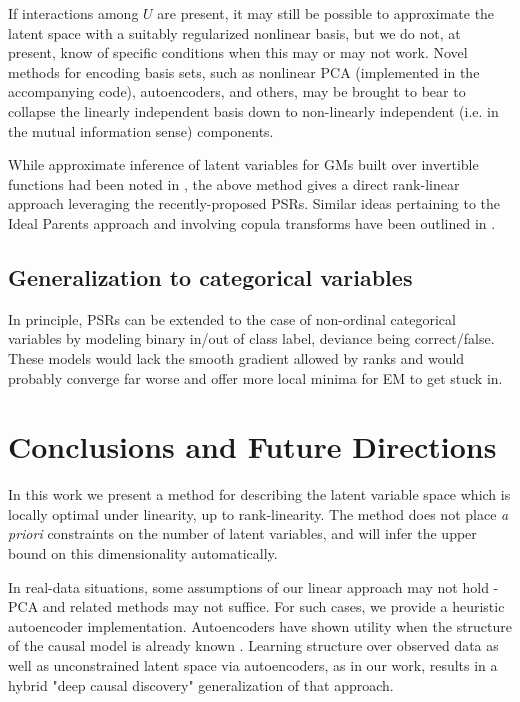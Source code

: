 \documentclass[letterpaper]{article}
\begin{document}
If interactions among $U$ are present, it may still be possible to approximate the latent space with a suitably regularized nonlinear basis, but we do not, at present, know of specific conditions when this may or may not work.  Novel methods for encoding basis sets, such as nonlinear PCA (implemented in the accompanying code), autoencoders, and others, may be brought to bear to collapse the linearly independent basis down to non-linearly independent (i.e. in the mutual information sense) components.

While approximate inference of latent variables for GMs built over invertible functions had been noted in \cite{elidan_ideal_2007}, the above method gives a direct rank-linear approach leveraging the recently-proposed PSRs.  Similar ideas pertaining to the Ideal Parents approach and involving copula transforms have been outlined in \cite{tenzer_generalized_2016}.

\subsection{Generalization to categorical variables}
In principle, PSRs can be extended to the case of non-ordinal categorical variables by modeling binary in/out of class label, deviance being correct/false.  These models would lack the smooth gradient allowed by ranks and would probably converge far worse and offer more local minima for EM to get stuck in.  

\section{Conclusions and Future Directions}
In this work we present a method for describing the latent variable space which is locally optimal under linearity, up to rank-linearity.  The method does not place \textit{a priori} constraints on the number of latent variables, and will infer the upper bound on this dimensionality automatically.  

In real-data situations, some assumptions of our linear approach may not hold - PCA and related methods may not suffice.  For such cases, we provide a heuristic autoencoder implementation.  Autoencoders have shown utility when the structure of the causal model is already known \cite{louizos_causal_2017}.  Learning structure over observed data as well as unconstrained latent space via autoencoders, as in our work, results in a hybrid "deep causal discovery" generalization of that approach.  
\end{document}
